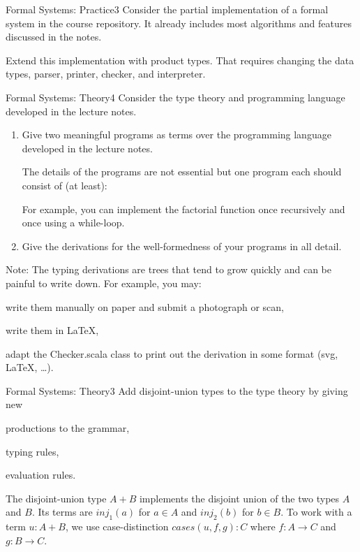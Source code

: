 \documentclass[a4paper]{article}
\begin{document}
\header

\begin{problem}{Formal Systems: Practice}{3}
Consider the partial implementation of a formal system in the course repository.
It already includes most algorithms and features discussed in the notes.

Extend this implementation with product types.
That requires changing the data types, parser, printer, checker, and interpreter.
\end{problem}

\begin{problem}{Formal Systems: Theory}{4}
Consider the type theory and programming language developed in the lecture notes.
\begin{enumerate}
\item Give two meaningful programs as terms over the programming language developed in the lecture notes.

The details of the programs are not essential but one program each should consist of (at least):
For example, you can implement the factorial function once recursively and once using a while-loop.

\item Give the derivations for the well-formedness of your programs in all detail.
\end{enumerate}

Note: The typing derivations are trees that tend to grow quickly and can be painful to write down.
For example, you may:
\begin{compactitem}
  \item write them manually on paper and submit a photograph or scan,
  \item write them in LaTeX,
  \item adapt the Checker.scala class to print out the derivation in some format (svg, LaTeX, \ldots).
\end{compactitem}
\end{problem}

\begin{problem}{Formal Systems: Theory}{3}
Add disjoint-union types to the type theory by giving new
\begin{compactitem}
 \item productions to the grammar,
 \item typing rules,
 \item evaluation rules.
\end{compactitem}

The disjoint-union type $A+B$ implements the disjoint union of the two types $A$ and $B$.
Its terms are $inj_1(a)$ for $a\in A$ and $inj_2(b)$ for $b\in B$.
To work with a term $u: A+B$, we use case-distinction $cases(u,f,g):C$ where $f:A\to C$ and $g:B\to C$.
\end{problem}
\end{document}
